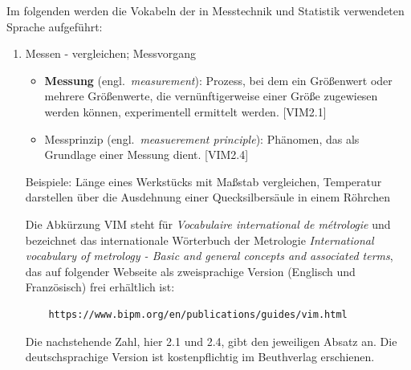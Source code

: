 \begin{raggedright}
Im folgenden werden die Vokabeln der in Messtechnik und Statistik verwendeten Sprache aufgeführt:
\begin{enumerate}
\item Messen - vergleichen; Messvorgang
	\begin{itemize}
	\item \textbf{Messung} (engl.\ \textsl{measurement}): Prozess, bei dem ein Größenwert oder mehrere Grö\-ßen\-werte, die
	vernünftigerweise einer Größe zugewiesen werden können, experimentell ermittelt werden. [VIM2.1]
	\item Messprinzip (engl.\ \textsl{measuerement principle}): Phänomen, das als Grundlage einer 
	Messung dient. [VIM2.4]
	\end{itemize}
	Beispiele: Länge eines Werkstücks mit Maßstab vergleichen, Temperatur darstellen über 
	die Ausdehnung einer Quecksilbersäule in einem Röhrchen

	Die Abkürzung VIM steht für \textsl{Vocabulaire international de m{\'e}trologie} 
	und bezeichnet das internationale Wörterbuch der Metrologie
	\textsl{International vocabulary of metrology - 
	Basic and general concepts and associated terms}, das auf folgender Webseite als zweisprachige
	Version (Englisch und Französisch) frei erhältlich ist:
	\begin{verbatim}
	https://www.bipm.org/en/publications/guides/vim.html
	\end{verbatim}
	Die nachstehende Zahl, hier 2.1 und 2.4, gibt den jeweiligen Absatz an. Die deutschsprachige
	Version ist kostenpflichtig im Beuthverlag erschienen.


\end{enumerate}
\end{raggedright}
